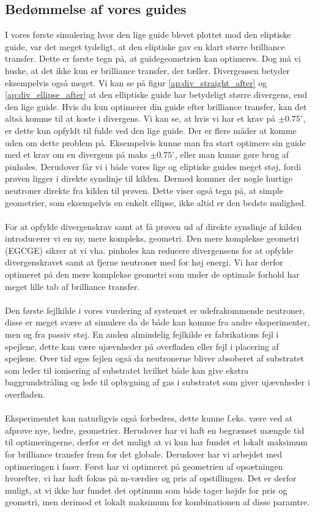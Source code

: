 \documentclass[12pt,oneside,a4paper]{article}
\begin{document}
{{{{{\subsection{Bedømmelse af vores guides}
I vores første simulering hvor den lige guide blevet plottet mod den eliptiske guide, var det meget tydeligt, at den eliptiske gav en klart større brilliance transfer. Dette er første tegn på, at guidegeometrien kan optimeres. Dog må vi huske, at det ikke kun er brilliance transfer, der tæller. Divergensen betyder eksempelvis også meget. Vi kan se på figur \ref{ap:div_straight_after} og \ref{ap:div_ellipse_after} at den elliptiske guide har betydeligt større divergens, end den lige guide. Hvis du kun optimerer din guide efter brilliance transfer, kan det altså komme til at koste i divergens. Vi kan se, at hvis vi har et krav på $\pm 0.75^\circ$, er dette kun opfyldt til fulde ved den lige guide. Der er flere måder at komme uden om dette problem på. Eksempelvis kunne man fra start optimere sin guide med et krav om en divergens på maks  $\pm 0.75^\circ$, eller man kunne gøre brug af pinholes. Derudover får vi i både vores lige og eliptiske guides meget støj, fordi prøven ligger i direkte synslinje til kilden. Dermed kommer der nogle hurtige neutroner direkte fra kilden til prøven. Dette viser også tegn på, at simple geometrier, som eksempelvis en enkelt ellipse, ikke altid er den bedste mulighed.
\\
\\
For at opfylde divergenskrav samt at få prøven ud af direkte synslinje af kilden introducerer vi en ny, mere kompleks, geometri. Den mere komplekse geometri (EGCGE) sikrer at vi vha. pinholes kan reducere divergensens for at opfylde divergenskravet samt at fjerne neutroner med for høj energi. Vi har derfor optimeret på den mere komplekse geometri som under de optimale forhold har meget lille tab af brilliance transfer.
\\
\\
Den første fejlkilde i vores vurdering af systemet er udefrakommende neutroner, disse er meget svære at simulere da de både kan komme fra andre eksperimenter, men og fra passiv støj. En anden almindelig fejlkilde er fabrikations fejl i spejlene, dette kan være ujævnheder på overfladen eller fejl i placering af spejlene. Over tid øges fejlen også da neutronerne bliver absoberet af substratet som leder til ionisering af substratet hvilket både kan give ekstra baggrundstråling og lede til opbygning af gas i substratet som giver ujævnheder i overfladen.
\\
\\
Eksperimentet kan naturligvis også forbedres, dette kunne f.eks. være ved at afprøve nye, bedre, geometrier. Herudover har vi haft en begrænset mængde tid til optimeringerne, derfor er det muligt at vi kun har fundet et lokalt maksimum for brilliance transfer frem for det globale. Derudover har vi arbejdet med optimeringen i faser. Først har vi optimeret på geometrien af opsætningen hvorefter, vi har haft fokus på m-værdier og pris af opstillingen. Det er derfor muligt, at vi ikke har fundet det optimum som både tager højde for pris og geometri, men derimod et lokalt maksimum for kombinationen af disse paramtre.

}}}}}
\end{document}
